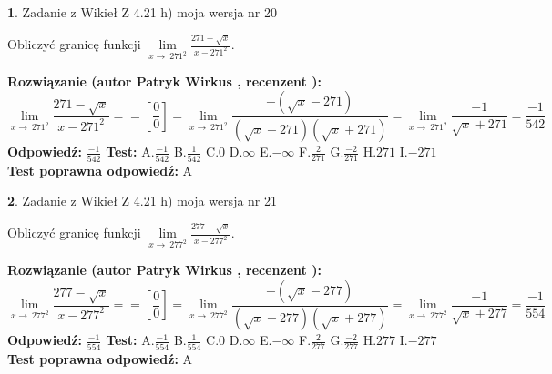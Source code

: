 \documentclass[12pt, a4paper]{article}
\theoremstyle{definition} %
\newtheorem{zad}{}
\newcommand{\zadStart}[1]{\begin{zad}#1\newline}
\newcommand{\zadStop}{\end{zad}}
\newcommand{\rozwStart}[2]{\noindent \textbf{Rozwiązanie (autor #1 , recenzent #2): }\newline}
\newcommand{\rozwStop}{\newline}
\newcommand{\odpStart}{\noindent \textbf{Odpowiedź:}\newline}
\newcommand{\odpStop}{\newline}
\newcommand{\testStart}{\noindent \textbf{Test:}\newline}
\newcommand{\testStop}{\newline}
\newcommand{\kluczStart}{\noindent \textbf{Test poprawna odpowiedź:}\newline}
\newcommand{\kluczStop}{\newline}
\begin{document}
\zadStart{Zadanie z Wikieł Z 4.21 h) moja wersja nr 20}

Obliczyć granicę funkcji $\lim\limits_{x\to\ 271^{2}}\frac{271-\sqrt{x}}{x-271^{2}}$.
\zadStop
\rozwStart{Patryk Wirkus}{}
$$\lim\limits_{x\to\ 271^{2}}\frac{271-\sqrt{x}}{x-271^{2}} = = [\frac{0}{0}] = \lim\limits_{x\to\ 271^{2}}\frac{-(\sqrt{x}-271)}{(\sqrt{x}-271)(\sqrt{x}+271)} = \lim\limits_{x\to\ 271^{2}}\frac{-1}{\sqrt{x}+271} = \frac{-1}{542}$$
\rozwStop
\odpStart
$\frac{-1}{542}$
\odpStop
\testStart
A.$\frac{-1}{542}$ B.$\frac{1}{542}$ C.$0$ D.$\infty$ E.$-\infty$
F.$\frac{2}{271}$ G.$\frac{-2}{271}$
H.$271$
I.$-271$
\testStop
\kluczStart
A
\kluczStop



\zadStart{Zadanie z Wikieł Z 4.21 h) moja wersja nr 21}

Obliczyć granicę funkcji $\lim\limits_{x\to\ 277^{2}}\frac{277-\sqrt{x}}{x-277^{2}}$.
\zadStop
\rozwStart{Patryk Wirkus}{}
$$\lim\limits_{x\to\ 277^{2}}\frac{277-\sqrt{x}}{x-277^{2}} = = [\frac{0}{0}] = \lim\limits_{x\to\ 277^{2}}\frac{-(\sqrt{x}-277)}{(\sqrt{x}-277)(\sqrt{x}+277)} = \lim\limits_{x\to\ 277^{2}}\frac{-1}{\sqrt{x}+277} = \frac{-1}{554}$$
\rozwStop
\odpStart
$\frac{-1}{554}$
\odpStop
\testStart
A.$\frac{-1}{554}$ B.$\frac{1}{554}$ C.$0$ D.$\infty$ E.$-\infty$
F.$\frac{2}{277}$ G.$\frac{-2}{277}$
H.$277$
I.$-277$
\testStop
\kluczStart
A
\kluczStop
\end{document}
